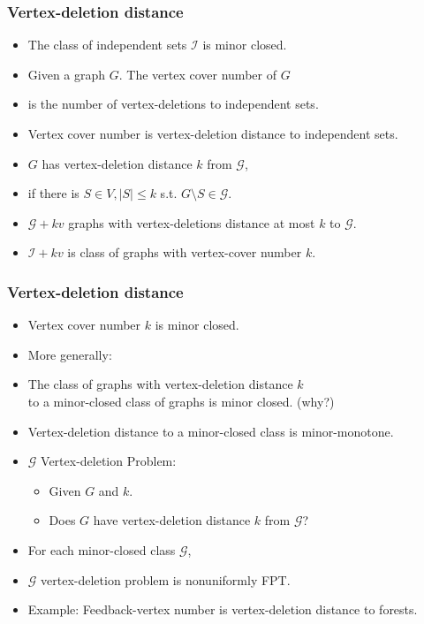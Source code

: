 \documentclass[t,usenames,dvipsnames]{beamer}
\begin{document}
\begin{frame}\frametitle{Vertex-deletion distance}
	\begin{itemize}[<+->]
		\item The class of independent sets $\mathcal{I}$ is minor closed.
		\item Given a graph $G$. The vertex cover number of $G$
		\item[] \hspace{1cm} is the number of vertex-deletions to independent sets.
		\item Vertex cover number is vertex-deletion distance to independent sets.
		\item $G$ has vertex-deletion distance $k$ from $\mathcal{G}$,
		\item[] \hspace{1cm} if there is $S \in V, |S| \leq k$ s.t. $G \setminus S \in
			\mathcal{G}$.
		\item $\mathcal{G} + k v$ graphs with vertex-deletions distance at most $k$ to
			$\mathcal{G}$.
		\item $\mathcal{I} + k v$ is class of graphs with vertex-cover number $k$.
	\end{itemize}
\end{frame}
\begin{frame}\frametitle{Vertex-deletion distance}
	\begin{itemize}[<+->]
		\item Vertex cover number $k$ is minor closed.
		\item More generally:
		\item[] The class of graphs with vertex-deletion distance $k$\\
			to a minor-closed class of graphs is minor closed. (why?)
		\item Vertex-deletion distance to a minor-closed class is minor-monotone.

		\item $\mathcal{G}$ Vertex-deletion Problem:
			\begin{itemize}
				\item Given $G$ and $k$.
				\item Does $G$ have vertex-deletion distance $k$ from $\mathcal{G}$?
			\end{itemize}
		\item For each minor-closed class $\mathcal{G}$, 
		\item[] \hspace{1cm} $\mathcal{G}$ vertex-deletion problem is nonuniformly FPT.
		\item Example: Feedback-vertex number is vertex-deletion distance to forests.
	\end{itemize}
\end{frame}
\end{document}
